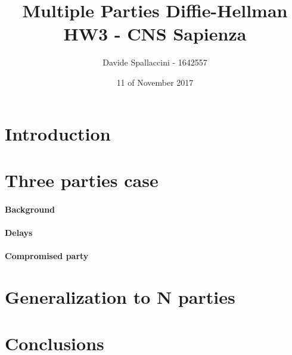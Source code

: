 \documentclass[11pt]{article}
\begin{document}
\title{Multiple Parties Diffie-Hellman\\ HW3 - CNS Sapienza}
\author{Davide Spallaccini - 1642557}
\date{11 of November 2017}
\maketitle

\section{Introduction}

\section{Three parties case}

\paragraph*{Background}

\paragraph*{Delays}

\paragraph*{Compromised party}

\section{Generalization to N parties}

\section{Conclusions}


\nocite{*} %
 

\end{document}
